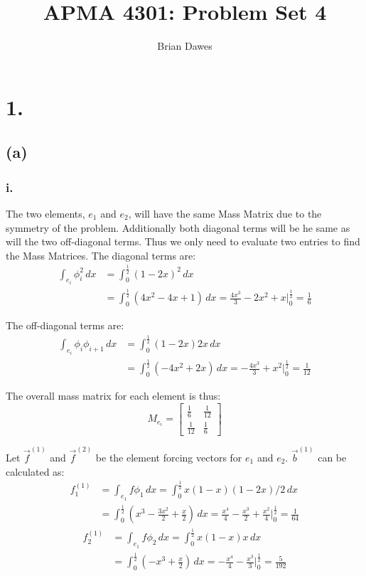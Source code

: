 \documentclass{article}
\begin{document}
\title{APMA 4301: Problem Set 4}
\author{Brian Dawes}
\maketitle

\section*{1.}
\subsection*{(a)}
\subsubsection*{i.}
The two elements, $e_1$ and $e_2$, will have the same Mass Matrix due to the symmetry of the problem. Additionally both diagonal terms will be he same as will the two off-diagonal terms. Thus we only need to evaluate two entries to find the Mass Matrices. The diagonal terms are:
\begin{align}
\int_{e_i}\phi_i^2\,dx &=\int_0^\frac 1 2 (1-2x)^2\,dx \nonumber\\
&= \int_0^\frac 1 2 (4x^2-4x+1)\,dx=\frac{4x^3}3-2x^2+x\Big|_0^\frac 1 2 = \frac 1 6
\end{align}

The off-diagonal terms are:
\begin{align}
\int_{e_i}\phi_i\phi_{i+1}\,dx &=\int_0^\frac 1 2 (1-2x)2x\,dx \nonumber\\
&= \int_0^\frac 1 2 (-4x^2+2x)\,dx = -\frac{4x^3}3+x^2 \Big|_0^\frac 1 2 = \frac 1{12}
\end{align}

The overall mass matrix for each element is thus:
\begin{equation}
\boxed{M_{e_i}=
\begin{bmatrix}
\frac 1 6 & \frac 1{12} \\[1ex]
\frac 1{12} & \frac 1 6
\end{bmatrix}
}
\end{equation}

Let $\vec f^{(1)}$ and $\vec f^{(2)}$ be the element forcing vectors for $e_1$ and $e_2$. $\vec b^{(1)}$ can be calculated as:
\begin{align}
f^{(1)}_1&=\int_{e_1} f\phi_1\,dx=\int_0^\frac{1}{2} x(1-x)(1-2x)/2\,dx \nonumber\\
&=\int_0^\frac{1}{2} \left(x^3-\frac{3x^2}2+\frac x 2\right)\,dx=\frac{x^4}4-\frac{x^3}2+\frac{x^2}{4}\Big|_0^\frac 12 = \frac{1}{64}
\end{align}
\begin{align}
f^{(1)}_2&=\int_{e_1} f\phi_2\,dx=\int_0^\frac{1}{2} x(1-x)x\,dx \nonumber\\
&=\int_0^\frac{1}{2} \left(-x^3+\frac x 2\right)\,dx=-\frac{x^4}4-\frac{x^3}3\Big|_0^\frac 12 = \frac{5}{192}
\end{align}
\end{document}
